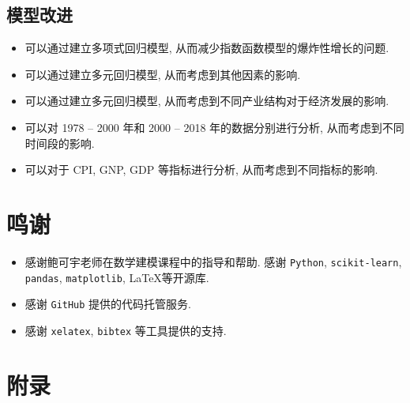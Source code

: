 \documentclass{article}
\begin{document}
\subsection{模型改进}

\begin{itemize}
  \item 可以通过建立多项式回归模型, 从而减少指数函数模型的爆炸性增长的问题.
  \item 可以通过建立多元回归模型, 从而考虑到其他因素的影响.
  \item 可以通过建立多元回归模型, 从而考虑到不同产业结构对于经济发展的影响.
  \item 可以对 1978 -- 2000 年和 2000 -- 2018 年的数据分别进行分析, 从而考虑到不同时间段的影响.
  \item 可以对于 CPI, GNP, GDP 等指标进行分析, 从而考虑到不同指标的影响.
\end{itemize}

\section*{鸣谢}

\begin{itemize}
    \item 感谢鲍可宇老师在数学建模课程中的指导和帮助. 感谢 \texttt{Python}, \texttt{scikit-learn}, \texttt{pandas}, \texttt{matplotlib}, \LaTeX 等开源库.
    \item 感谢 \texttt{GitHub} 提供的代码托管服务.
    \item 感谢 \texttt{xelatex}, \texttt{bibtex} 等工具提供的支持.
\end{itemize}

{}


\nocite{*}

\section*{附录}
\end{document}
